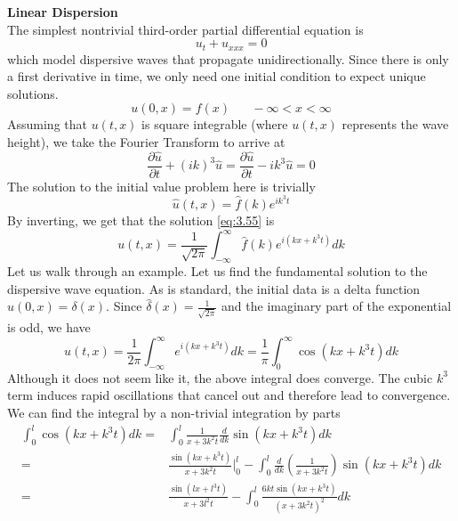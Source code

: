 \documentclass{article}
\newcommand{\pd}[2]{\frac{\partial #1}{\partial #2}}
\newcommand{\od}[2]{\frac{d #1}{d #2}}
\numberwithin{equation}{section}
\begin{document}
\textbf{Linear Dispersion}\\
The simplest nontrivial third-order partial differential equation is 
\begin{equation}
    u_t + u_{xxx} = 0 \label{eq:3.55}
\end{equation}
which model dispersive waves that propagate unidirectionally. Since there is only a first derivative in time, we only need one initial condition to expect unique solutions.
\begin{equation*}
    u(0,x) = f(x) \hspace{20pt}-\infty < x <\infty
\end{equation*}
Assuming that $u(t,x)$ is square integrable (where $u(t,x)$ represents the wave height), we take the Fourier Transform to arrive at 
\begin{equation*}
    \pd{\hat{u}}{t} +(ik)^3\hat{u} = \pd{\hat{u}}{t} -ik^3\hat{u} = 0
\end{equation*}
The solution to the initial value problem here is trivially 
\begin{equation*}
    \hat{u}(t,x) = \hat{f}(k) e^{ik^3t}
\end{equation*}
By inverting, we get that the solution \eqref{eq:3.55} is 
\begin{equation}
    u(t,x) = \frac{1}{\sqrt{2\pi}} \int ^\infty_{-\infty} \hat{f}(k)e^{i(kx+k^3t)}dk
\end{equation}
Let us walk through an example. Let us find the fundamental solution to the dispersive wave equation. As is standard, the initial data is a delta function $u(0,x) = \delta (x)$. Since $\hat{\delta}(x) = \frac{1}{\sqrt{2\pi}}$ and the imaginary part of the exponential is odd, we have 
\begin{equation}
    u(t,x) = \frac{1}{2\pi}\int^\infty_{-\infty} e^{i(kx+k^3t)}dk = \frac{1}{\pi}\int^\infty_0 \cos(kx+k^3t)dk \label{eq:3.57}
\end{equation}
Although it does not seem like it, the above integral does converge. The cubic $k^3$ term induces rapid oscillations that cancel out and therefore lead to convergence. We can find the integral by a non-trivial integration by parts 
\begin{equation}
\begin{split}
    \int^l_0 \cos(kx+k^3t)dk =& \int^l_0\frac{1}{x+3k^2t}\od{}{k} \sin(kx+k^3t)dk\\
    =&\frac{\sin(kx+k^3t)}{x+3k^2t} \bigg|^l_0 -\int^l_0\od{}{k} \left( \frac{1}{x+3k^2t}\right)\sin(kx+k^3t)dk \\
    =&\frac{\sin(lx+l^3t)}{x+3l^2t} -\int^l_0 \frac{6kt\sin(kx+k^3t)}{(x+3k^2t)^2}dk
\end{split}
\end{equation}
\end{document}
